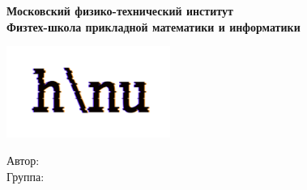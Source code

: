 \begin{titlepage}
	\clearpage\thispagestyle{empty}
	\centering

	\textbf{Московский физико-технический институт \\ Физтех-школа прикладной математики и информатики}
	\vspace{33ex}

	{\textbf{\FullCourseNameFirstPart}}

	\SemesterNumber
	\vspace{1ex}

	\textit{\LecturerInitials}

	\includegraphics[width=0.4\textwidth]{images/logo_ltc.png}

	\begin{flushright}
		\noindent
		Автор: \href{\TGLink}{\textit{\AuthorInitials}}
		\\
		Группа: \textit{\AuthorAddInfo}
	\end{flushright}

	\vfill
	\CourseDate
	\pagebreak
\end{titlepage}
